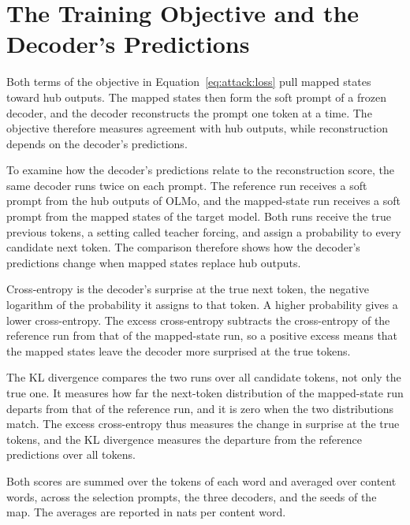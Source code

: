 \section{The Training Objective and the Decoder's Predictions}\label{sec:attack:teacher}

Both terms of the objective in Equation~\ref{eq:attack:loss} pull mapped states toward hub outputs.
The mapped states then form the soft prompt of a frozen decoder, and the decoder reconstructs the prompt one token at a time.
The objective therefore measures agreement with hub outputs, while reconstruction depends on the decoder's predictions.

To examine how the decoder's predictions relate to the reconstruction score, the same decoder runs twice on each prompt.
The reference run receives a soft prompt from the hub outputs of OLMo, and the mapped-state run receives a soft prompt from the mapped states of the target model.
Both runs receive the true previous tokens, a setting called teacher forcing, and assign a probability to every candidate next token.
The comparison therefore shows how the decoder's predictions change when mapped states replace hub outputs.

Cross-entropy is the decoder's surprise at the true next token, the negative logarithm of the probability it assigns to that token.
A higher probability gives a lower cross-entropy.
The excess cross-entropy subtracts the cross-entropy of the reference run from that of the mapped-state run, so a positive excess means that the mapped states leave the decoder more surprised at the true tokens.

The KL divergence compares the two runs over all candidate tokens, not only the true one.
It measures how far the next-token distribution of the mapped-state run departs from that of the reference run, and it is zero when the two distributions match.
The excess cross-entropy thus measures the change in surprise at the true tokens, and the KL divergence measures the departure from the reference predictions over all tokens.

Both scores are summed over the tokens of each word and averaged over content words, across the selection prompts, the three decoders, and the seeds of the map.
The averages are reported in nats per content word. %

